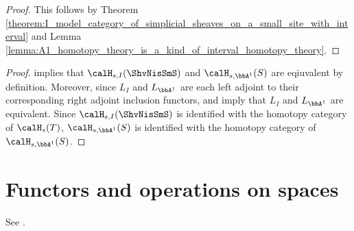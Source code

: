 





\begin{proof}
    This follows by Theorem \ref{theorem:I_model_category_of_simplicial_sheaves_on_a_small_site_with_interval} and Lemma \ref{lemma:A1_homotopy_theory_is_a_kind_of_interval_homotopy_theory}.
\end{proof}



\begin{proof}
     implies that $\calH_{s,I}(\ShvNisSmS)$ and $\calH_{s,{\bbA}^1}(S)$ are eqiuvalent by definition. Moreover, since $L_I$ and $L_{{\bbA}^1}$ are each left adjoint to their corresponding right adjoint inclusion functors,  and  imply that $L_I$ and $L_{{\bbA}^1}$ are equivalent. Since $\calH_{s,I}(\ShvNisSmS)$ is identified with the homotopy category of $\calH_s(T)$, $\calH_{s,{\bbA}^1}(S)$ is identified with the homotopy category of $\calH_{s,\bbA^1}(S)$.
\end{proof}







\section{Functors and operations on spaces}

See \cite[After Section 2 Lemma 2.30]{morel_voevodsky_1999}.






